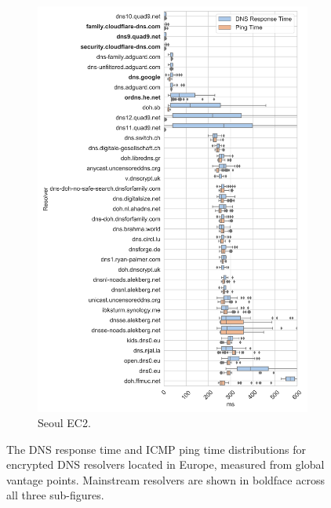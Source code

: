 \begin{figure}[t!]
\begin{subfigure}[b]{0.4\textwidth}
\includegraphics[width=\textwidth]{figures/seoul_eur.png}
\caption{Seoul EC2.}
\label{fig:subfigb}
\end{subfigure}
\caption{The DNS response time and ICMP ping time distributions for
    encrypted DNS resolvers located in Europe, measured from global vantage points.
    Mainstream resolvers are shown in boldface across all three
    sub-figures.}
\label{fig:dns-europe}
\end{figure}


